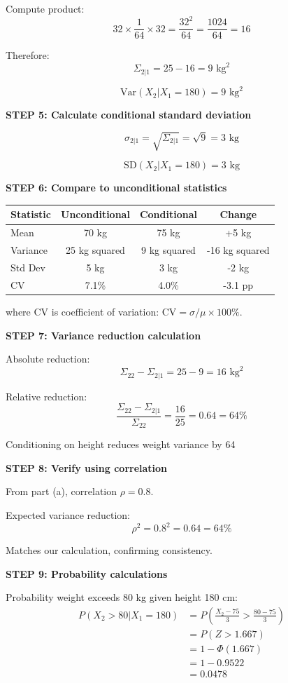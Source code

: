 \documentclass[12pt]{article}
\begin{document}
\begin{solution}
Compute product:
\[
32 \times \frac{1}{64} \times 32 = \frac{32^2}{64} = \frac{1024}{64} = 16
\]

Therefore:
\[
\Sigma_{2|1} = 25 - 16 = 9 \text{ kg}^2
\]

\[
\boxed{\text{Var}(X_2 | X_1 = 180) = 9 \text{ kg}^2}
\]

\textbf{STEP 5: Calculate conditional standard deviation}

\[
\sigma_{2|1} = \sqrt{\Sigma_{2|1}} = \sqrt{9} = 3 \text{ kg}
\]

\[
\boxed{\text{SD}(X_2 | X_1 = 180) = 3 \text{ kg}}
\]

\textbf{STEP 6: Compare to unconditional statistics}

\begin{center}
\begin{tabular}{l|c|c|c}
Statistic & Unconditional & Conditional & Change \\
\hline
Mean & 70 kg & 75 kg & +5 kg \\
Variance & 25 kg squared & 9 kg squared & -16 kg squared \\
Std Dev & 5 kg & 3 kg & -2 kg \\
CV & 7.1\% & 4.0\% & -3.1 pp
\end{tabular}
\end{center}

where CV is coefficient of variation: $\text{CV} = \sigma/\mu \times 100\%$.

\textbf{STEP 7: Variance reduction calculation}

Absolute reduction:
\[
\Sigma_{22} - \Sigma_{2|1} = 25 - 9 = 16 \text{ kg}^2
\]

Relative reduction:
\[
\frac{\Sigma_{22} - \Sigma_{2|1}}{\Sigma_{22}} = \frac{16}{25} = 0.64 = 64\%
\]

Conditioning on height reduces weight variance by 64%

\textbf{STEP 8: Verify using correlation}

From part (a), correlation $\rho = 0.8$.

Expected variance reduction:
\[
\rho^2 = 0.8^2 = 0.64 = 64\%
\]

Matches our calculation, confirming consistency.

\textbf{STEP 9: Probability calculations}

Probability weight exceeds 80 kg given height 180 cm:
\begin{align*}
P(X_2 > 80 | X_1 = 180) &= P\left(\frac{X_2 - 75}{3} > \frac{80 - 75}{3}\right) \\
&= P(Z > 1.667) \\
&= 1 - \Phi(1.667) \\
&= 1 - 0.9522 \\
&= 0.0478
\end{align*}


\end{solution}
\end{document}
